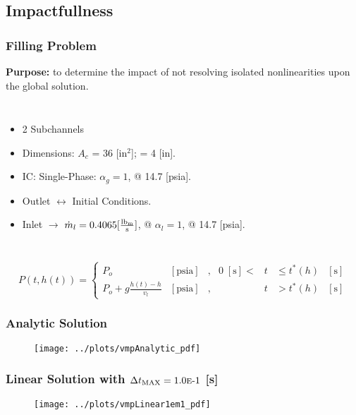 \documentclass[compress,xcolor=table]{beamer}
\begin{document}
\subsection[Impactfullness]{Impactfullness}
\begin{frame}
\frametitle{Filling Problem}

\textbf{Purpose:} to determine the impact of not resolving isolated nonlinearities upon the global solution.
\begin{columns}
\begin{itemize}
\item{2 Subchannels}
\item{Dimensions: $A_{c}$ = 36 [in$^2$]; \dx{} = 4 [in].}
\item{IC: Single-Phase: $\alpha_{g} = 1$, @ 14.7 [psia].}
\item{Outlet $\longleftrightarrow$ Initial Conditions.}
\item{Inlet $\rightarrow$ $\dot{m}_{l} = 0.4065 [\frac{\lbm{}}{\text{s}}]$, @ $\alpha_{l}=1$, @ 14.7 [psia].}
\end{itemize}
\resizebox{!}{0.50\textheight}{

}
\end{columns}

\begin{equation*}
P(t, h(t))= 
 \left\{
\begin{array}{cclrcll}
P_o & [ \text{psia} ] & , & 0\; [\text{s}] < & t & \leq t^{*}(h) & [\text{s}] \\
P_o + g \frac{ h(t) - h }{ v_{l} } & [ \text{psia} ] & , &  & t & > t^{*}(h) & [\text{s}]
\end{array}\right.
\end{equation*}

\end{frame}
\begin{frame}
\frametitle{Analytic Solution}

\begin{figure}[h!t]
\centering
\texttt{[image: ../plots/vmpAnalytic\_pdf]}
\end{figure}

\end{frame}
\begin{frame}
\frametitle{Linear Solution with $\dtmax{} = \expneg{1.0}{1}$ [s]}

\begin{figure}[h!t]
\centering
\texttt{[image: ../plots/vmpLinear1em1\_pdf]}
\end{figure}



\end{frame}
\end{document}
